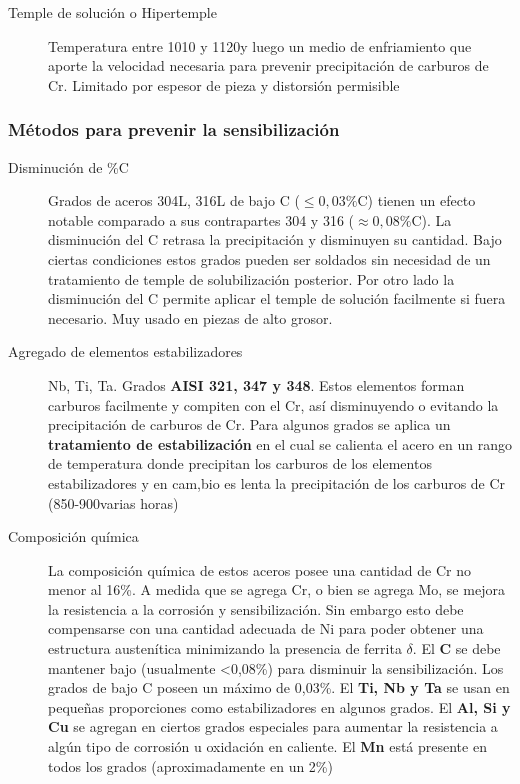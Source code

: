 \begin{description}
	\item[Temple de solución o Hipertemple] Temperatura entre 1010 y 1120\grad y luego un medio de enfriamiento que aporte la velocidad necesaria para prevenir precipitación de carburos de Cr. Limitado por espesor de pieza y distorsión permisible
\end{description}


\subsubsection{Métodos para prevenir la sensibilización}

\begin{description}
	\item[Disminución de \%C]  Grados de aceros 304L, 316L de bajo C ($\leq0,03\%$C) tienen un efecto notable comparado a sus contrapartes 304 y 316 ($\approx 0,08\%$C). La disminución del C retrasa la precipitación y disminuyen su cantidad. Bajo ciertas condiciones estos grados pueden ser soldados sin necesidad de un tratamiento de temple de solubilización posterior. Por otro lado la disminución del C permite aplicar el temple de solución facilmente si fuera necesario. Muy usado en piezas de alto grosor. 
	\item[Agregado de elementos estabilizadores] Nb, Ti, Ta. Grados \textbf{AISI 321, 347 y 348}. Estos elementos forman carburos facilmente y compiten con el Cr, así disminuyendo o evitando la precipitación de carburos de Cr. Para algunos grados se aplica un \textbf{tratamiento de estabilización} en el cual se calienta el acero en un rango de temperatura donde precipitan los carburos de los elementos estabilizadores y en cam,bio es lenta la precipitación de los carburos de Cr (850-900\grad varias horas)
	\item[Composición química] La composición química de estos aceros posee una cantidad de Cr no menor al 16\%. A medida que se agrega Cr, o bien se agrega Mo, se mejora la resistencia a la corrosión y sensibilización. Sin embargo esto debe compensarse con una cantidad adecuada de Ni para poder obtener una estructura austenítica minimizando la presencia de ferrita $\delta$. El \textbf{C} se debe mantener bajo (usualmente <0,08\%) para disminuir la sensibilización. Los grados de bajo C poseen un máximo de 0,03\%. El \textbf{Ti, Nb y Ta} se usan en pequeñas proporciones como estabilizadores en algunos grados. El \textbf{Al, Si y Cu} se agregan en ciertos grados especiales para aumentar la resistencia a algún tipo de corrosión u oxidación en caliente. El \textbf{Mn} está presente en todos los grados (aproximadamente en un 2\%)   
\end{description}

\subsubsection{}
